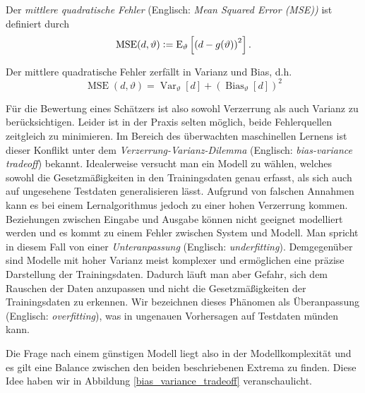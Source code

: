 \begin{defn}
Der \textit{mittlere quadratische Fehler} (Englisch: \textit{Mean Squared Error (MSE))} ist definiert durch
$$\operatorname {MSE} (d,\vartheta ) \vcentcolon= \operatorname{E} _{\vartheta}\left[\left(d-g(\vartheta )\right)^{2}\right].$$
\end{defn}

\begin{thm}
Der mittlere quadratische Fehler zerfällt in Varianz und Bias, d.h.
$$\operatorname{MSE} (d,\vartheta) = \operatorname{Var}_{\vartheta}[d]+\left(\operatorname{Bias}_{\vartheta}[d]\right)^{2}$$
\end{thm}

Für die Bewertung eines Schätzers ist also sowohl Verzerrung als auch Varianz zu berücksichtigen. Leider ist in der Praxis selten möglich, beide Fehlerquellen zeitgleich zu minimieren. Im Bereich des überwachten maschinellen Lernens ist dieser Konflikt unter dem \textit{Verzerrung-Varianz-Dilemma} (Englisch: \textit{bias-variance tradeoff}) bekannt. Idealerweise versucht man ein Modell zu wählen, welches sowohl die Gesetzmäßigkeiten in den Trainingsdaten genau erfasst, als sich auch auf ungesehene Testdaten generalisieren lässt.
Aufgrund von falschen Annahmen kann es bei einem Lernalgorithmus jedoch zu einer hohen Verzerrung kommen. Beziehungen zwischen Eingabe und Ausgabe können nicht geeignet modelliert werden und es kommt zu einem Fehler zwischen System und Modell. Man spricht in diesem Fall von einer \textit{Unteranpassung} (Englisch: \textit{underfitting}).
Demgegenüber sind Modelle mit hoher Varianz meist komplexer und ermöglichen eine präzise Darstellung der Trainingsdaten. Dadurch läuft man aber Gefahr, sich dem Rauschen der Daten anzupassen und nicht die Gesetzmäßigkeiten der Trainingsdaten zu erkennen. Wir bezeichnen dieses Phänomen als Überanpassung (Englisch: \textit{overfitting}), was in ungenauen Vorhersagen auf Testdaten münden kann. 

Die Frage nach einem günstigen Modell liegt also in der Modellkomplexität und es gilt eine Balance zwischen den beiden beschriebenen Extrema zu finden. Diese Idee haben wir in Abbildung \ref{bias_variance_tradeoff} veranschaulicht.

